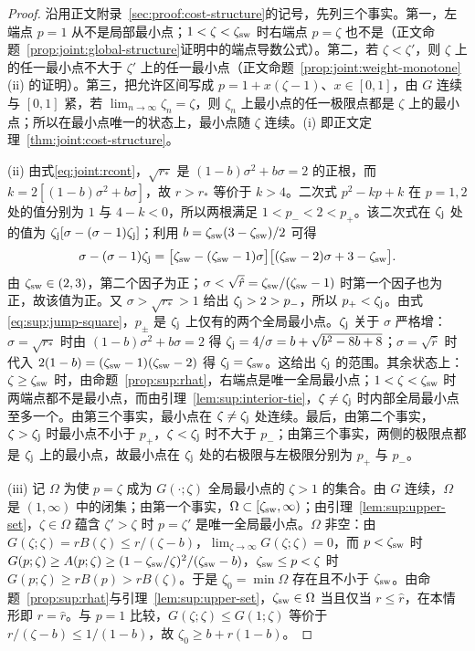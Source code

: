 \begin{proof}
沿用正文附录~\ref{sec:proof:cost-structure}的记号，先列三个事实。第一，左端点 $p=1$ 从不是局部最小点；$1<\zeta<\zeta_{\rm sw}$ 时右端点 $p=\zeta$ 也不是（正文命题~\ref{prop:joint:global-structure}证明中的端点导数公式）。第二，若 $\zeta<\zeta'$，则 $\zeta$ 上的任一最小点不大于 $\zeta'$ 上的任一最小点（正文命题~\ref{prop:joint:weight-monotone}(ii) 的证明）。第三，把允许区间写成 $p=1+x(\zeta-1)$、$x\in[0,1]$，由 $G$ 连续与 $[0,1]$ 紧，若 $\lim_{n\to\infty}\zeta_n=\zeta$，则 $\zeta_n$ 上最小点的任一极限点都是 $\zeta$ 上的最小点；所以在最小点唯一的状态上，最小点随 $\zeta$ 连续。(i) 即正文定理~\ref{thm:joint:cost-structure}。

(ii) 由式\eqref{eq:joint:rcont}，$\sqrt{r_*}$ 是 $(1-b)\sigma^2+b\sigma=2$ 的正根，而 $k=2[(1-b)\sigma^2+b\sigma]$，故 $r>r_*$ 等价于 $k>4$。二次式 $p^2-kp+k$ 在 $p=1,2$ 处的值分别为 $1$ 与 $4-k<0$，所以两根满足 $1<p_-<2<p_+$。该二次式在 $\zeta_{\rm j}$ 处的值为 $\zeta_{\rm j}[\sigma-(\sigma-1)\zeta_{\rm j}]$；利用 $b=\zeta_{\rm sw}(3-\zeta_{\rm sw})/2$ 可得
\begin{equation}
\sigma-(\sigma-1)\zeta_{\rm j}=\bigl[\zeta_{\rm sw}-(\zeta_{\rm sw}-1)\sigma\bigr]\bigl[(\zeta_{\rm sw}-2)\sigma+3-\zeta_{\rm sw}\bigr].
\label{eq:sup:jump-factor}
\end{equation}
由 $\zeta_{\rm sw}\in(2,3)$，第二个因子为正；$\sigma<\sqrt{\hat r}=\zeta_{\rm sw}/(\zeta_{\rm sw}-1)$ 时第一个因子也为正，故该值为正。又 $\sigma>\sqrt{r_*}>1$ 给出 $\zeta_{\rm j}>2>p_-$，所以 $p_+<\zeta_{\rm j}$。由式\eqref{eq:sup:jump-square}，$p_\pm$ 是 $\zeta_{\rm j}$ 上仅有的两个全局最小点。$\zeta_{\rm j}$ 关于 $\sigma$ 严格增：$\sigma=\sqrt{r_*}$ 时由 $(1-b)\sigma^2+b\sigma=2$ 得 $\zeta_{\rm j}=4/\sigma=b+\sqrt{b^2-8b+8}$；$\sigma=\sqrt{\hat r}$ 时代入 $2(1-b)=(\zeta_{\rm sw}-1)(\zeta_{\rm sw}-2)$ 得 $\zeta_{\rm j}=\zeta_{\rm sw}$。这给出 $\zeta_{\rm j}$ 的范围。其余状态上：$\zeta\ge\zeta_{\rm sw}$ 时，由命题~\ref{prop:sup:rhat}，右端点是唯一全局最小点；$1<\zeta<\zeta_{\rm sw}$ 时两端点都不是最小点，而由引理~\ref{lem:sup:interior-tie}，$\zeta\ne\zeta_{\rm j}$ 时内部全局最小点至多一个。由第三个事实，最小点在 $\zeta\ne\zeta_{\rm j}$ 处连续。最后，由第二个事实，$\zeta>\zeta_{\rm j}$ 时最小点不小于 $p_+$，$\zeta<\zeta_{\rm j}$ 时不大于 $p_-$；由第三个事实，两侧的极限点都是 $\zeta_{\rm j}$ 上的最小点，故最小点在 $\zeta_{\rm j}$ 处的右极限与左极限分别为 $p_+$ 与 $p_-$。

(iii) 记 $\Omega$ 为使 $p=\zeta$ 成为 $G(\cdot;\zeta)$ 全局最小点的 $\zeta>1$ 的集合。由 $G$ 连续，$\Omega$ 是 $(1,\infty)$ 中的闭集；由第一个事实，$\Omega\subset[\zeta_{\rm sw},\infty)$；由引理~\ref{lem:sup:upper-set}，$\zeta\in\Omega$ 蕴含 $\zeta'>\zeta$ 时 $p=\zeta'$ 是唯一全局最小点。$\Omega$ 非空：由 $G(\zeta;\zeta)=rB(\zeta)\le r/(\zeta-b)$，$\lim_{\zeta\to\infty}G(\zeta;\zeta)=0$，而 $p<\zeta_{\rm sw}$ 时 $G(p;\zeta)\ge A(p;\zeta)\ge(1-\zeta_{\rm sw}/\zeta)^2/(\zeta_{\rm sw}-b)$，$\zeta_{\rm sw}\le p<\zeta$ 时 $G(p;\zeta)\ge rB(p)>rB(\zeta)$。于是 $\zeta_0=\min\Omega$ 存在且不小于 $\zeta_{\rm sw}$。由命题~\ref{prop:sup:rhat}与引理~\ref{lem:sup:upper-set}，$\zeta_{\rm sw}\in\Omega$ 当且仅当 $r\le\hat r$，在本情形即 $r=\hat r$。与 $p=1$ 比较，$G(\zeta;\zeta)\le G(1;\zeta)$ 等价于 $r/(\zeta-b)\le1/(1-b)$，故 $\zeta_0\ge b+r(1-b)$。


\end{proof}
